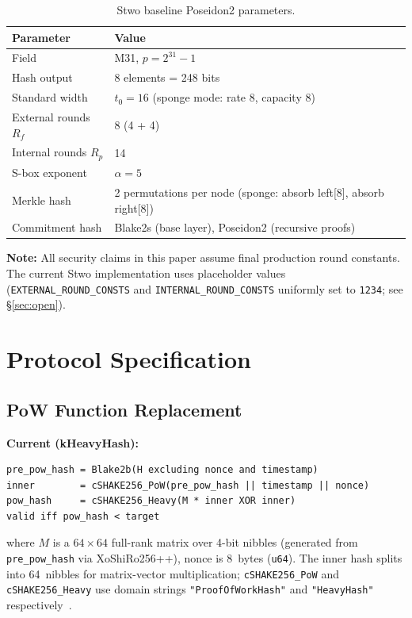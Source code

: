 \documentclass[11pt,a4paper]{article}
\begin{document}
\begin{table}[h]
\centering
\begin{tabular}{@{}ll@{}}
\toprule
Parameter & Value \\
\midrule
Field & M31, $p = 2^{31}-1$ \\
Hash output & 8 elements = 248 bits \\
Standard width & $t_0 = 16$ (sponge mode: rate 8, capacity 8) \\
External rounds $R_f$ & 8 (4 + 4) \\
Internal rounds $R_p$ & 14 \\
S-box exponent & $\alpha = 5$ \\
Merkle hash & 2 permutations per node (sponge: absorb left[8], absorb right[8]) \\
Commitment hash & Blake2s (base layer), Poseidon2 (recursive proofs) \\
\bottomrule
\end{tabular}
\caption{Stwo baseline Poseidon2 parameters.}
\label{tab:stwo-baseline}
\end{table}

\textbf{Note:} All security claims in this paper assume final production round constants. The current Stwo implementation uses placeholder values (\texttt{EXTERNAL\_ROUND\_CONSTS} and \texttt{INTERNAL\_ROUND\_CONSTS} uniformly set to \texttt{1234}; see \S\ref{sec:open}).

\section{Protocol Specification}
\label{sec:protocol}

\subsection{PoW Function Replacement}
\label{sec:pow-replacement}

\textbf{Current (kHeavyHash):}
\begin{Verbatim}[fontsize=\small]
pre_pow_hash = Blake2b(H excluding nonce and timestamp)
inner        = cSHAKE256_PoW(pre_pow_hash || timestamp || nonce)
pow_hash     = cSHAKE256_Heavy(M * inner XOR inner)
valid iff pow_hash < target
\end{Verbatim}
where $M$ is a $64\times64$ full-rank matrix over 4-bit nibbles (generated from \texttt{pre\_pow\_hash} via XoShiRo256++), nonce is 8~bytes (\texttt{u64}). The inner hash splits into 64~nibbles for matrix-vector multiplication; \texttt{cSHAKE256\_PoW} and \texttt{cSHAKE256\_Heavy} use domain strings \texttt{"ProofOfWorkHash"} and \texttt{"HeavyHash"} respectively~\cite{kaspa}.
\end{document}
